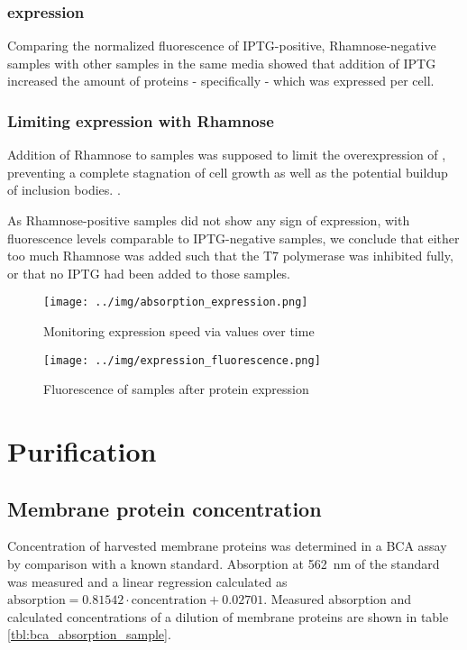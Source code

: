 \subsubsection{\hsdsred{} expression}

Comparing the normalized fluorescence of IPTG-positive, Rhamnose-negative
samples with other samples in the same media showed that addition of IPTG
increased the amount of proteins - specifically \hsdsred{} - which was expressed
per cell.

\subsubsection{Limiting \hsdsred{} expression with Rhamnose}

Addition of Rhamnose to samples was supposed to limit the overexpression of
\hsdsred{}, preventing a complete stagnation of cell growth as well as the
potential buildup of inclusion bodies. \cite{memstar}.

As Rhamnose-positive samples did not show any sign of \hsdsred{} expression, with
fluorescence levels comparable to IPTG-negative samples, we conclude that
either too much Rhamnose was added such that the T7 polymerase was inhibited
fully, or that no IPTG had been added to those samples.


\begin{figure}
	\centering
	\texttt{[image: ../img/absorption\_expression.png]}
	\caption{Monitoring expression speed via \odbact values over time}
	\label{fig:absorption_expression}
\end{figure}

\begin{figure}
	\centering
	\texttt{[image: ../img/expression\_fluorescence.png]}
	\caption{Fluorescence of samples after protein expression}
	\label{fig:fluorescence_expression}
\end{figure}

\section{Purification}

\subsection{Membrane protein concentration}

Concentration of harvested membrane proteins was determined in a BCA assay by
comparison with a known standard. Absorption at \SI{562}{\nm} of the standard
was measured and a linear regression calculated as $\text{absorption} = 0.81542
\cdot \text{concentration} + 0.02701$. Measured absorption and calculated
concentrations of a dilution of membrane proteins are shown in table
\ref{tbl:bca_absorption_sample}.

